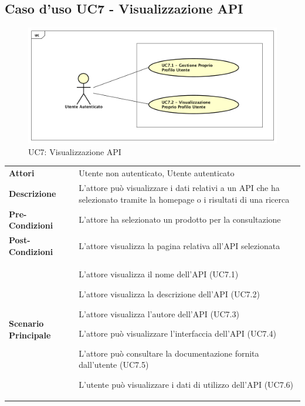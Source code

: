 \newpage
\subsection{Caso d'uso UC7 - Visualizzazione API}
\label{UC7}
\begin{figure}[ht]
	\centering
	\includegraphics[scale=0.45]{UML/UC7.png}
	\caption{UC7: Visualizzazione API}
\end{figure}

\begin{longtable}{ l | p{11cm}}
	\hline
	\rowcolor{Gray}
	\multicolumn{2}{c}{UC7 - Visualizzazione API}\\
	\hline
	
	 \textbf{Attori} & Utente non autenticato, Utente autenticato  \\
	\textbf{Descrizione} & L'attore può visualizzare i dati relativi a un API che ha selezionato tramite la homepage o i risultati di una ricerca  \\
	\textbf{Pre-Condizioni} & L'attore ha selezionato un prodotto per la consultazione \\
	\textbf{Post-Condizioni} & L'attore visualizza la pagina relativa all'API selezionata\\
	\textbf{Scenario Principale} & 
	\begin{enumerate*}[label=(\arabic*.),itemjoin={\newline}]
		\item L'attore visualizza il nome dell'API (UC7.1)
		\item L'attore visualizza la descrizione dell'API (UC7.2)
		\item L'attore visualizza l'autore dell'API (UC7.3)
		\item L'attore può visualizzare l'interfaccia dell'API (UC7.4)
		\item L'attore può consultare la documentazione fornita dall'utente (UC7.5)
		\item L'utente può visualizzare i dati di utilizzo dell'API  (UC7.6)
	\end{enumerate*}\\
\end{longtable}
